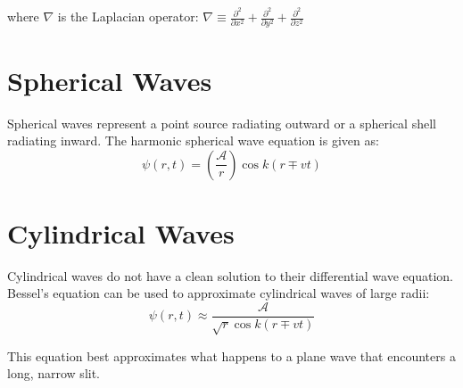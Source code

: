 \documentclass[12pt]{report}
\begin{document}
where $\nabla$ is the Laplacian operator: $\nabla \equiv \frac{\partial ^2}{\partial x^2}+\frac{\partial ^2}{\partial y^2}+\frac{\partial ^2}{\partial z^2}$

\section{Spherical Waves}
Spherical waves represent a point source radiating outward or a spherical shell radiating inward. The harmonic spherical wave equation is given as:
\begin{equation}
\psi (r,t) = \left( \frac{\mathcal{A}}{r} \right)\cos k(r \mp vt )
\end{equation}

\section{Cylindrical Waves}
Cylindrical waves do not have a clean solution to their differential wave equation. Bessel's equation can be used to approximate cylindrical waves of large radii:
\[\psi(r,t) \approx \frac{\mathcal{A}}{\sqrt{r} \cos k(r \mp vt)}\]

This equation best approximates what happens to a plane wave that encounters a long, narrow slit. 
\end{document}
